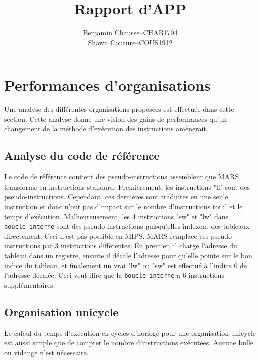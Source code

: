 \documentclass[a11paper]{article}
\title{Rapport d'APP}
\author{
  \addtolength{\tabcolsep}{-0.4em}
  \begin{tabular}{rcl} %
      Benjamin Chausse & -- & CHAB1704 \\
      Shawn Couture    & -- & COUS1912 \\
  \end{tabular}
}
\newcommand{\todo}[1]{\begin{color}{Red}\textbf{TODO:} #1\end{color}}
\begin{document}
\maketitle
\newpage
\tableofcontents
\newpage
{}  %
\setcounter{page}{1}    %

\section{Performances d'organisations}

Une analyse des différentes organisations proposées est effectuée dans cette
section. Cette analyse donne une vision des gains de performances qu'un
changement de la méthode d'exécution des instructions amènerait.

\subsection{Analyse du code de référence}

Le code de référence contient des pseudo-instructions assembleur que MARS
transforme en instructions standard. Premièrement, les instructions "li" sont
des pseudo-instructions. Cependant, ces dernières sont traduites en une seule
instruction et donc n'ont pas d'impact sur le nombre d'instructions total
et le temps d'exécution. Malheureusement, les 4 instructions "sw" et "lw"
dans \verb|boucle_interne| sont des pseudo-instructions puisqu'elles indexent
des tableaux directement. Ceci n'est pas possible en MIPS. MARS remplace ces
pseudo-instructions par 3 instructions différentes. En premier, il charge
l'adresse du tableau dans un registre, ensuite il décale l'adresse pour
qu'elle pointe sur le bon indice du tableau, et finalement un vrai "lw" ou
"sw" est effectué à l'indice 0 de l'adresse décalée. Ceci veut dire que la
\verb|boucle_interne| a 6 instructions supplémentaires.

\subsection{Organisation unicycle}


Le calcul du temps d'exécution en cycles d'horloge pour une organisation
unicycle est aussi simple que de compter le nombre d'instructions exécutées.
Aucune bulle ou vidange n'est nécessaire.
\end{document}
